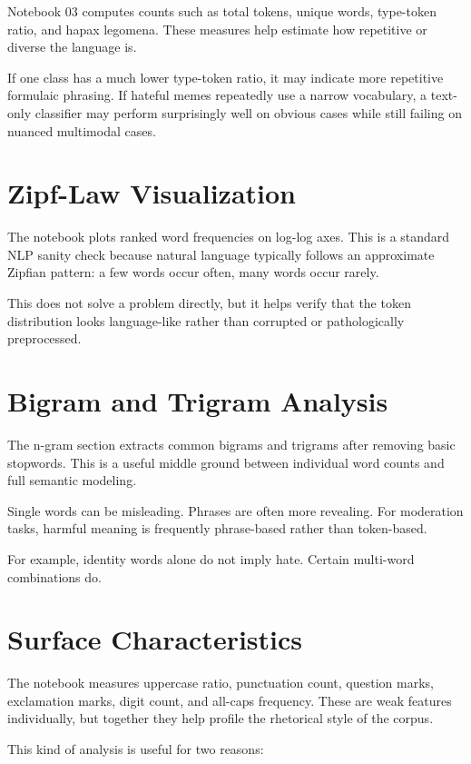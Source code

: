 \documentclass[11pt,a4paper]{report}
\begin{document}
Notebook 03 computes counts such as total tokens, unique words, type-token ratio, and hapax legomena. These measures help estimate how repetitive or diverse the language is.

If one class has a much lower type-token ratio, it may indicate more repetitive formulaic phrasing. If hateful memes repeatedly use a narrow vocabulary, a text-only classifier may perform surprisingly well on obvious cases while still failing on nuanced multimodal cases.

\section{Zipf-Law Visualization}

The notebook plots ranked word frequencies on log-log axes. This is a standard NLP sanity check because natural language typically follows an approximate Zipfian pattern: a few words occur often, many words occur rarely.

This does not solve a problem directly, but it helps verify that the token distribution looks language-like rather than corrupted or pathologically preprocessed.

\section{Bigram and Trigram Analysis}

The n-gram section extracts common bigrams and trigrams after removing basic stopwords. This is a useful middle ground between individual word counts and full semantic modeling.

Single words can be misleading. Phrases are often more revealing. For moderation tasks, harmful meaning is frequently phrase-based rather than token-based.

For example, identity words alone do not imply hate. Certain multi-word combinations do.

\section{Surface Characteristics}

The notebook measures uppercase ratio, punctuation count, question marks, exclamation marks, digit count, and all-caps frequency. These are weak features individually, but together they help profile the rhetorical style of the corpus.

This kind of analysis is useful for two reasons:
\end{document}
